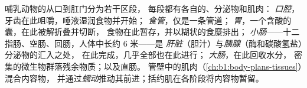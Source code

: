 \begin{proposition}[哺乳动物的消化道]\label{prop:b1:digestion-absorption:tract}
哺乳动物的从口到肛门分为若干区段，
每段都有各自的、分泌物和肌肉：
\emph{口腔}，牙齿在此咀嚼，唾液湿润食物并开始；
\emph{食管}，仅是一条管道；
\emph{胃}，一个含酸的囊，在此被解折叠并切断，
食物在此暂存，并以糊状的食糜排出；
\emph{小肠}——十二指肠、空肠、回肠，人体中长约 6 米——是
\emph{肝脏}（胆汁）与\emph{胰腺}（酶和碳酸氢盐）分泌物的汇入之处，
在此完成，几乎全部也在此进行；
\emph{大肠}，在此回收水分，
密集的微生物群落残余物质；以及直肠。
管壁中的肌肉（\cref{ch:b1:body-plans-tissues}）混合内容物，
并通过\emph{蠕动}推动其前进；括约肌在各阶段将内容物暂留。
\end{proposition}

